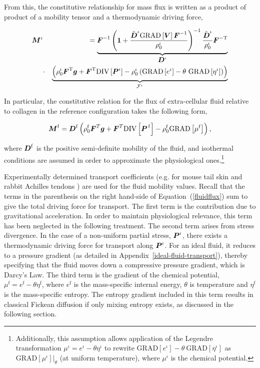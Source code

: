 \noindent From this, the constitutive relationship for mass flux is
written as a product of product of a mobility tensor and a
thermodynamic driving force,

\begin{eqnarray}
\mbox{\boldmath$ M$}^\iota & &=\underbrace{\mbox{\boldmath$ F$}^{-1}\left({\bf 1} +
  \frac{\tilde{\mbox{\boldmath$ D$}}^\iota\mathrm{GRAD}\left[\mbox{\boldmath$ V$}\right]
    \mbox{\boldmath$ F$}^{-1}}{\rho^\iota_0}\right)^{-1}
  \frac{\tilde{\mbox{\boldmath$ D$}}^\iota}{\rho^\iota_0}\mbox{\boldmath$ F$}^{-\mathrm{T}}}_{\mbox{\boldmath$ D$}^\iota}
\nonumber\\ &\cdot&\underbrace{\left(\rho_0^\iota\mbox{\boldmath$ F$}^\mathrm{T}\mbox{\boldmath$ g$} +
  \mbox{\boldmath$ F$}^\mathrm{T}\mathrm{DIV}\left[\mbox{\boldmath$ P$}^\iota\right] -
  \rho^\iota_0\left(\mathrm{GRAD}\left[e^\iota\right] -
  \theta\ \mathrm{GRAD}\left[\eta^\iota\right]\right)\right)}
_{{\mathcal F}^\iota} 
\label{constitutive-relation-flux-3}
\end{eqnarray}

In particular, the constitutive relation for the flux of
extra-cellular fluid relative to collagen in the reference
configuration takes the following form,

\begin{equation}
\mbox{\boldmath$ M$}^\mathrm{f} = \mbox{\boldmath$ D$}^\mathrm{f}\left(\rho_0^\mathrm{f}\mbox{\boldmath$ F$}^T\mbox{\boldmath$ g$} +
\mbox{\boldmath$ F$}^T\mathrm{DIV}\left[\mbox{\boldmath$ P$}^{\,\mathrm{f}}\right] -
\rho_0^\mathrm{f}\mathrm{GRAD}\left[\mu^\mathrm{f}\right]\right),
\label{fluidflux}
\end{equation}

\noindent where $\mbox{\boldmath$ D$}^\mathrm{f}$ is the positive semi-definite
mobility of the fluid, and isothermal conditions are assumed in order
to approximate the physiological ones.\footnote{Additionally, this
  assumption allows application of the Legendre transformation
  \mbox{$\mu^\iota = e^\iota - \theta\eta^\iota$} to rewrite
  \mbox{$\mathrm{GRAD}\left[e^\iota\right] -
    \theta\ \mathrm{GRAD}\left[\eta^\iota\right]$} as
  $\mathrm{GRAD}\left[\mu^\iota\right]\vert_\theta$ (at uniform
  temperature), where $\mu^\iota$ is the chemical potential.}

Experimentally determined transport coefficients (e.g. for mouse tail
skin \citep{Swartzetal:99} and rabbit Achilles tendons
\citep{Hanetal:2000}) are used for the fluid mobility values. Recall
that the terms in the parenthesis on the right hand-side of
\mbox{Equation (\ref{fluidflux})} sum to give the total driving force
for transport. The first term is the contribution due to gravitational
acceleration. In order to maintain physiological relevance, this term
has been neglected in the following treatment. The second term arises
from stress divergence. In the case of a non-uniform partial stress,
$\mbox{\boldmath$ P$}^\iota$, there exists a thermodynamic driving force for transport
along $\mbox{\boldmath$ P$}^\iota$. For an ideal fluid, it reduces to a pressure
gradient (as detailed in Appendix~\ref{ideal-fluid-transport}),
thereby specifying that the fluid moves down a compressive pressure
gradient, which is Darcy's Law. The third term is the gradient of the
chemical potential, $\mu^\mathrm{f} = e^\mathrm{f} - \theta
\eta^\mathrm{f}$, where $e^\mathrm{f}$ is the mass-specific internal
energy, $\theta$ is temperature and $\eta^\mathrm{f}$ is the
mass-specific entropy. The entropy gradient included in this term
results in classical Fickean diffusion if only mixing entropy exists,
as discussed in the following section.

